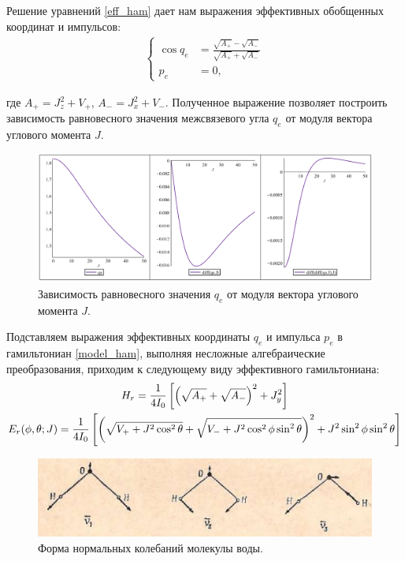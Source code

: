 Решение уравнений \eqref{eff_ham} дает нам выражения эффективных обобщенных координат и импульсов:
\begin{gather}
\left\{
\begin{aligned}
\cos q_e &= \frac{\sqrt{A_{+}} - \sqrt{A_{-}}}{\sqrt{A_{+}} + \sqrt{A_{-}}} \\
p_e &= 0,
\end{aligned}
\right.
\label{eq_angle}
\end{gather}

\vlevo где $A_{+} = J_z^2 + V_{+}$, $A_{-} = J_x^2 + V_{-}$. 
Полученное выражение позволяет построить зависимость равновесного значения межсвязевого угла $q_e$ от модуля вектора углового момента $J$. 
\vverh
\begin{figure}[!ht]
  \centering
	\includegraphics[width=\textwidth]{../pictures/qe_rigid.png}
	\caption{Зависимость равновесного значения $q_e$ от модуля вектора углового момента $J$.}
	\label{fig:qe}
\end{figure}

Подставляем выражения эффективных координаты $q_e$ и импульса $p_e$ в гамильтониан \eqref{model_ham}, выполняя несложные алгебраические преобразования, приходим к следующему виду эффективного гамильтониана:
\vverh
\begin{gather}
H_r = \frac{1}{4I_0} \left[ \left( \sqrt{A_{+}} + \sqrt{A_{-}} \right)^2 + J_y^2 \right] \notag \\
E_r (\phi, \theta; J) = \frac{1}{4I_0} \left[ \left( \sqrt{V_{+} + J^2 \cos^2 \theta} + \sqrt{V_{-} + J^2 \cos^2 \phi \sin^2 \theta} \right)^2 + J^2 \sin^2 \phi \sin^2 \theta \right] \notag
\end{gather}

\begin{figure}[H]
  \centering
	\includegraphics[scale=0.75]{../pictures/NormalModes.png}
	\caption{Форма нормальных колебаний молекулы воды.}
\end{figure}

